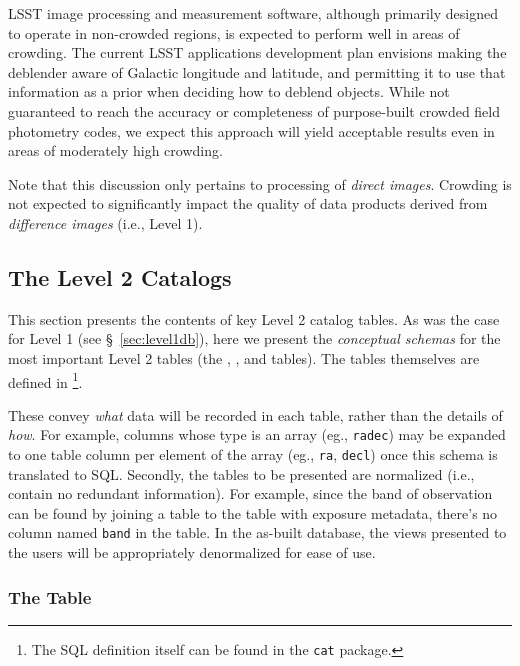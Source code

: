 \documentclass[SE,lsstdraft,toc]{lsstdoc}
\newcommand{\newtext}[1]{{\color{blue} #1}}
\newcommand{\marginreq}[1]{\marginpar{\hspace{0pt}\tiny #1}}
\newcommand{\dmreq}[1]{\marginreq{DMS-REQ-#1}}
\newcommand{\lsstdoc}[1]{{\color{blue}\citell{#1}}}
\begin{document}
LSST image processing and measurement software, although primarily designed to operate in non-crowded regions, is expected to perform well in areas of crowding. The current LSST applications development plan envisions making the deblender aware of Galactic longitude and latitude, and permitting it to use that information as a prior when deciding how to deblend objects. While not guaranteed to reach the accuracy or completeness of purpose-built crowded field photometry codes, we expect this approach will yield acceptable results even in areas of moderately high crowding.

Note that this discussion only pertains to processing of \emph{direct images}. Crowding is not expected to significantly impact the quality of data products derived from \emph{difference images} (i.e., Level 1).

\subsection{The Level 2 Catalogs}

This section presents the contents of key Level 2 catalog tables. As was the case for Level 1 (see \S~\ref{sec:level1db}), here we present the \emph{conceptual schemas} for the most important Level 2 tables (the \Object, \Source, and \ForcedSource tables).
\newtext{The tables themselves are defined in \lsstdoc{LDM-153}\footnote{\newtext{The SQL definition itself can be found in the \texttt{cat} package.}}.}

These convey \emph{what} data will be recorded in each table, rather than the details of \emph{how}. For example, columns whose type is an array (eg., \texttt{radec}) may be expanded to one table column per element of the array (eg., \texttt{ra}, \texttt{decl}) once this schema is translated to SQL. Secondly, the tables to be presented are normalized (i.e., contain no redundant information). For example, since the band of observation can be found by joining a \Source table to the table with exposure metadata, there's no column named \texttt{band} in the \Source table. In the as-built database, the views presented to the users will be appropriately denormalized for ease of use.\dmreq{0332}

\subsubsection{The \Object Table}
\label{sec:objectTable}
\dmreq{0275}
\end{document}
